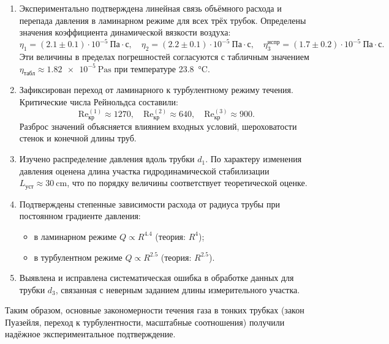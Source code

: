 \documentclass[12pt,a4paper]{article}
\begin{document}
\begin{enumerate}
    \item Экспериментально подтверждена линейная связь объёмного расхода и перепада давления в ламинарном режиме для всех трёх трубок. Определены значения коэффициента динамической вязкости воздуха:
    \[
    \eta_1 = (2.1 \pm 0.1)\cdot 10^{-5}~\text{Па}\cdot\text{с},\quad
    \eta_2 = (2.2 \pm 0.1)\cdot 10^{-5}~\text{Па}\cdot\text{с},\quad
    \eta_3^{\text{испр}} = (1.7 \pm 0.2)\cdot 10^{-5}~\text{Па}\cdot\text{с}.
    \]
    Эти величины в пределах погрешностей согласуются с табличным значением $\eta_{\text{табл}} \approx \qty{1.82e-5}{\Pa\s}$ при температуре \qty{23.8}{\celsius}.

    \item Зафиксирован переход от ламинарного к турбулентному режиму течения. Критические числа Рейнольдса составили:
    \[
    \mathrm{Re}_{\text{кр}}^{(1)} \approx 1270,\quad
    \mathrm{Re}_{\text{кр}}^{(2)} \approx 640,\quad
    \mathrm{Re}_{\text{кр}}^{(3)} \approx 900.
    \]
    Разброс значений объясняется влиянием входных условий, шероховатости стенок и конечной длины труб.

    \item Изучено распределение давления вдоль трубки $d_1$. По характеру изменения давления оценена длина участка гидродинамической стабилизации $L_{\text{уст}} \approx \qty{30}{\cm}$, что по порядку величины соответствует теоретической оценке.

    \item Подтверждены степенные зависимости расхода от радиуса трубы при постоянном градиенте давления:
    \begin{itemize}
        \item в ламинарном режиме $Q \propto R^{4.4}$ (теория: $R^4$);
        \item в турбулентном режиме $Q \propto R^{2.5}$ (теория: $R^{2.5}$).
    \end{itemize}

    \item Выявлена и исправлена систематическая ошибка в обработке данных для трубки $d_3$, связанная с неверным заданием длины измерительного участка.
\end{enumerate}

Таким образом, основные закономерности течения газа в тонких трубках (закон Пуазейля, переход к турбулентности, масштабные соотношения) получили надёжное экспериментальное подтверждение.
\end{document}
